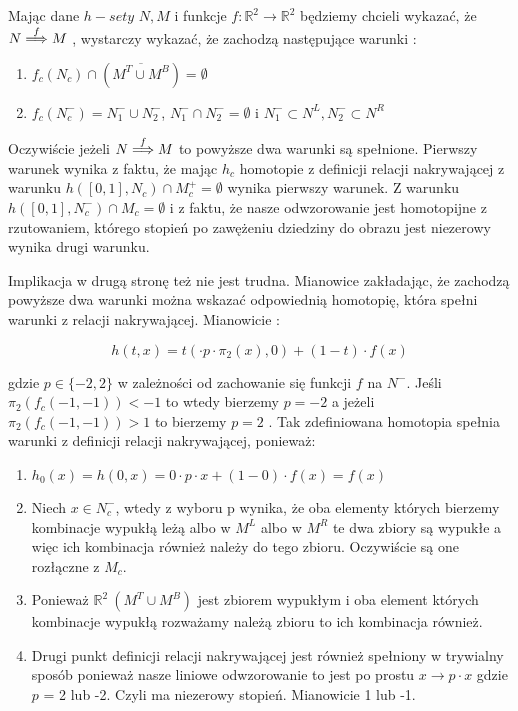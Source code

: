Mając dane $ h-sety $ $ N,M $ i funkcje $ f : \mathbb R^2 \to \mathbb R^2 $ będziemy chcieli wykazać, że  $N \stackrel{f}{\Longrightarrow} M$ , wystarczy 
wykazać, że zachodzą następujące warunki :
\begin{enumerate}
 \item $ f_c(N_c) \cap ( \overline{M^T \cup M^B} ) = \emptyset $
 \item $ f_c(N^-_c) = N^{-}_1 \cup N^{-}_2 $, $ N^{-}_1 \cap N^{-}_2 = \emptyset $ i $ N^-_1 \subset N^L , N^-_2 \subset N^R $ 
\end{enumerate}

Oczywiście jeżeli $ N \stackrel{f}{\Longrightarrow} M $ to powyższe dwa warunki są spełnione.
Pierwszy warunek wynika z faktu, że mając $h_c $ homotopie z definicji relacji nakrywającej z warunku 
$ h([0,1],N_c) \cap M^+_c = \emptyset $ wynika pierwszy warunek. Z warunku $ h([0,1],N^-_c) \cap M_c = \emptyset $ i z faktu, że nasze 
odwzorowanie jest homotopijne z rzutowaniem, którego stopień po zawężeniu dziedziny do obrazu jest niezerowy wynika drugi warunku.

Implikacja w drugą stronę też nie jest trudna. Mianowice zakładając, że zachodzą powyższe dwa warunki można wskazać odpowiednią homotopię,
która spełni warunki z relacji nakrywającej.
Mianowicie :

$$
  h(t,x) = t( \cdot p \cdot \pi_2(x),0) + (1-t)\cdot f(x)
$$

gdzie $ p \in \{-2,2\} $ w zależności od zachowanie się funkcji $ f $ na $ N^-$. Jeśli $ \pi_2(f_c( -1,-1)) < -1 $ to wtedy bierzemy $ p = -2 $ 
a jeżeli $ \pi_2(f_c( -1,-1)) > 1 $  to bierzemy $ p = 2 $ . 
Tak zdefiniowana homotopia spełnia warunki z definicji relacji nakrywającej, ponieważ:
\begin{enumerate}
 \item $ h_0(x) = h(0,x) = 0 \cdot p \cdot x + (1-0) \cdot f(x) = f(x) $
 \item Niech $ x \in N^-_c $, wtedy z wyboru p wynika, że oba elementy których bierzemy kombinacje wypukłą leżą albo w $ M^L $ albo w $ M^R$ 
 te dwa zbiory są wypukłe a więc ich kombinacja również należy do tego zbioru. Oczywiście są one rozłączne z $ M_c$.
 \item Ponieważ $ \mathbb R^2 \ (M^T \cup M^B) $ jest zbiorem wypukłym i oba element których kombinacje wypukłą rozważamy należą 
 zbioru to ich kombinacja również.
 \item Drugi punkt definicji relacji nakrywającej jest również spełniony w trywialny sposób ponieważ nasze liniowe 
 odwzorowanie to jest po prostu
 $ x \to p \cdot x $ gdzie $ p $ = 2 lub -2. Czyli ma niezerowy stopień. Mianowicie 1 lub -1.
\end{enumerate}

